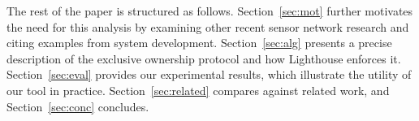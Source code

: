 The rest of the paper is structured as follows.  
%
Section~\ref{sec:mot} further motivates the need for this analysis by
examining other recent sensor network research and citing examples from
system development.
%
Section~\ref{sec:alg} presents a precise description of the exclusive
ownership protocol and how Lighthouse enforces it.  
%
Section~\ref{sec:eval} provides our experimental results, which illustrate
the utility of our tool in practice.  
%
Section~\ref{sec:related} compares against related work, and
Section~\ref{sec:conc} concludes.



